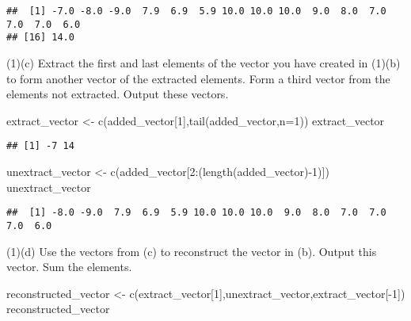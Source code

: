 \documentclass[
]{article}
\newenvironment{Shaded}{\begin{snugshade}}{\end{snugshade}}
\newcommand{\AttributeTok}[1]{\textcolor[rgb]{0.77,0.63,0.00}{#1}}
\newcommand{\DecValTok}[1]{\textcolor[rgb]{0.00,0.00,0.81}{#1}}
\newcommand{\FunctionTok}[1]{\textcolor[rgb]{0.00,0.00,0.00}{#1}}
\newcommand{\NormalTok}[1]{#1}
\newcommand{\OtherTok}[1]{\textcolor[rgb]{0.56,0.35,0.01}{#1}}
\newcommand{\SpecialCharTok}[1]{\textcolor[rgb]{0.00,0.00,0.00}{#1}}
\begin{document}
\begin{verbatim}
##  [1] -7.0 -8.0 -9.0  7.9  6.9  5.9 10.0 10.0 10.0  9.0  8.0  7.0  7.0  7.0  6.0
## [16] 14.0
\end{verbatim}

(1)(c) Extract the first and last elements of the vector you have
created in (1)(b) to form another vector of the extracted elements. Form
a third vector from the elements not extracted. Output these vectors.

\begin{Shaded}
\begin{Highlighting}[]
\NormalTok{extract\_vector }\OtherTok{\textless{}{-}} \FunctionTok{c}\NormalTok{(added\_vector[}\DecValTok{1}\NormalTok{],}\FunctionTok{tail}\NormalTok{(added\_vector,}\AttributeTok{n=}\DecValTok{1}\NormalTok{))}
\NormalTok{extract\_vector}
\end{Highlighting}
\end{Shaded}

\begin{verbatim}
## [1] -7 14
\end{verbatim}

\begin{Shaded}
\begin{Highlighting}[]
\NormalTok{unextract\_vector }\OtherTok{\textless{}{-}} \FunctionTok{c}\NormalTok{(added\_vector[}\DecValTok{2}\SpecialCharTok{:}\NormalTok{(}\FunctionTok{length}\NormalTok{(added\_vector)}\SpecialCharTok{{-}}\DecValTok{1}\NormalTok{)])}
\NormalTok{unextract\_vector}
\end{Highlighting}
\end{Shaded}

\begin{verbatim}
##  [1] -8.0 -9.0  7.9  6.9  5.9 10.0 10.0 10.0  9.0  8.0  7.0  7.0  7.0  6.0
\end{verbatim}

(1)(d) Use the vectors from (c) to reconstruct the vector in (b). Output
this vector. Sum the elements.

\begin{Shaded}
\begin{Highlighting}[]
\NormalTok{reconstructed\_vector }\OtherTok{\textless{}{-}} \FunctionTok{c}\NormalTok{(extract\_vector[}\DecValTok{1}\NormalTok{],unextract\_vector,extract\_vector[}\SpecialCharTok{{-}}\DecValTok{1}\NormalTok{])}
\NormalTok{reconstructed\_vector}
\end{Highlighting}
\end{Shaded}
\end{document}
